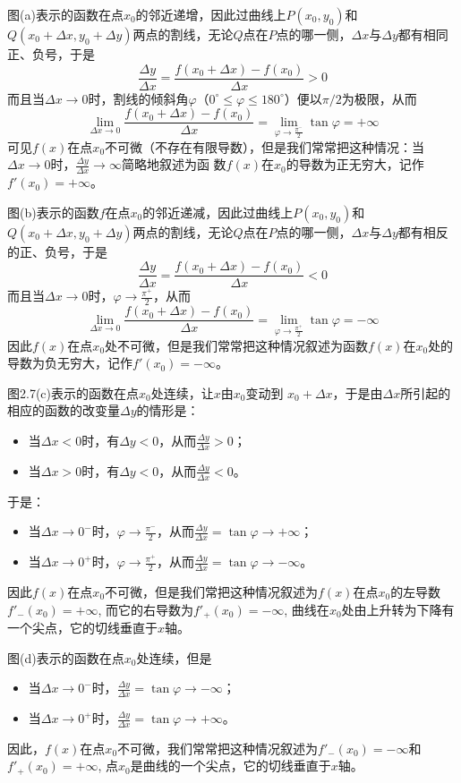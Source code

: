 图(a)表示的函数在点$x_0$的邻近递增，因此过曲线上$P(x_0,y_0)$和$Q(x_0+\Delta x,y_0+\Delta y)$两点的割线，无论$Q$点在$P$点的哪一侧，$\Delta x$与$\Delta y$都有相同正、负号，于是
\[\frac{\Delta y}{\Delta x}=\frac{f(x_0+\Delta x)-f(x_0)}{\Delta x}>0\]
而且当$\Delta x\to 0$时，割线的倾斜角$\varphi$（$0^{\circ}\le \varphi\le 180^{\circ}$）便以$\pi/2$为极限，从而
\[\lim_{\Delta x\to 0}\frac{f(x_0+\Delta x)-f(x_0)}{\Delta x}=\lim_{\varphi\to \tfrac{\pi^-}{2}}\tan\varphi=+\infty\]
可见$f(x)$在点$x_0$不可微（不存在有限导数），但是我们常常把这种情况：当$\Delta x\to 0$时，$\frac{\Delta y}{\Delta x}\to\infty$简略地叙述为函
数$f(x)$在$x_0$的导数为正无穷大，记作$f'(x_0)=+\infty$。

图(b)表示的函数$f$在点$x_0$的邻近递减，因此过曲线上$P(x_0,y_0)$和$Q(x_0+\Delta x,y_0+\Delta y)$两点的割线，无论$Q$点在$P$点的哪一侧，$\Delta x$与$\Delta y$都有相反的正、负号，于是
\[\frac{\Delta y}{\Delta x}=\frac{f(x_0+\Delta x)-f(x_0)}{\Delta x}<0\]
而且当$\Delta x\to 0$时，$\varphi\to \frac{\pi^+}{2}$，从而
\[\lim_{\Delta x\to 0}\frac{f(x_0+\Delta x)-f(x_0)}{\Delta x}=\lim_{\varphi\to \tfrac{\pi^+}{2}}\tan\varphi=-\infty\]
因此$f(x)$在点$x_0$处不可微，但是我们常常把这种情况叙述为函数$f(x)$在$x_0$处的导数为负无穷大，记作$f'(x_0)=-\infty$。

图2.7(c)表示的函数在点$x_0$处连续，让$x$由$x_0$变动到
$x_0+\Delta x$，于是由$\Delta x$所引起的相应的函数的改变量$\Delta y$的情形是：
\begin{itemize}
    \item 当$\Delta x<0$时，有$\Delta y<0$，从而$\frac{\Delta y}{\Delta x}>0$；
    \item 当$\Delta x>0$时，有$\Delta y<  0$，从而$\frac{\Delta y}{\Delta x}<0$。
\end{itemize}
于是：
\begin{itemize}
    \item 当$\Delta x\to 0^-$时，$\varphi\to \frac{\pi^-}{2}$，从而$\frac{\Delta y}{\Delta x}=\tan\varphi\to +\infty$；
    \item 当$\Delta x\to 0^+$时，$\varphi\to \frac{\pi^+}{2}$，从而$\frac{\Delta y}{\Delta x}=\tan\varphi\to -\infty$。
\end{itemize}
因此$f(x)$在点$x_0$不可微，但是我们常把这种情况叙述为$f(x)$在点$x_0$的左导数$f'_-(x_0)=+\infty$, 而它的右导数为$f'_+(x_0)=-\infty$, 曲线在$x_0$处由上升转为下降有一个尖点，它的切线垂直于$x$轴。

图(d)表示的函数在点$x_0$处连续，但是
\begin{itemize}
    \item 当$\Delta x\to 0^-$时，$\frac{\Delta y}{\Delta x}=\tan\varphi\to -\infty$；
    \item 当$\Delta x\to 0^+$时，$\frac{\Delta y}{\Delta x}=\tan\varphi\to +\infty$。
\end{itemize}
因此，$f(x)$在点$x_0$不可微，我们常常把这种情况叙述为$f'_-(x_0)=-\infty$和$f'_+(x_0)=+\infty$, 点$x_0$是曲线的一个尖点，它的切线垂直于$x$轴。

